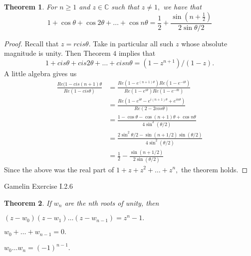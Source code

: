 \documentclass[letter]{article}
\newtheorem{theorem}{Theorem}
\newenvironment{menumerate}{%
  \edef\backupindent{\the\parindent}%
  \enumerate%
  \setlength{\parindent}{\backupindent}%
}{\endenumerate}
\begin{document}
\begin{menumerate}
        \begin{theorem}
            For $n\geq 1$ and $z \in \mathbb{C}$ such that $z \neq 1,$ we have that
            \begin{equation*}
                1 +\cos \theta + \cos 2 \theta + \dots + \cos n \theta = \frac12 + \frac{\sin(n + \frac12)}{2 \sin \theta/2}
            \end{equation*}
        \end{theorem}
        \begin{proof}
            Recall  that $z = r cis\theta.$ Take in particular all such $z$ whose absolute magnitude is unity. 
            Then Theorem $4$ implies that 
            \begin{equation*}
                1 + cis \theta + cis 2 \theta + \dots + cis n \theta = (1-z^{n+1})/(1-z).
            \end{equation*}
            A little algebra gives us 
            \begin{equation*}
                \begin{aligned}
                    \frac{Re(1 - cis (n+1)\theta}{Re(1 - cis \theta)} &= \frac{Re(1 - e^{(n+1)\theta})Re(1-e^{-i\theta})}{Re(1 - e^{i\theta})Re(1-e^{-\theta i})} \\
                    &= \frac{Re(1 - e^{i\theta} - e^{i(n+1)\theta} + e^{in\theta})}{Re(2 - 2cos\theta)} \\
                    &= \frac{1 - \cos\theta - \cos (n+1)\theta + \cos n \theta}{4 \sin^2(\theta/2)} \\
                    &= \frac{2\sin^2{\theta/2}- \sin(n  + 1/2)\sin(\theta/2)}{4 \sin^2(\theta/2)} \\
                    &= \frac12 -\frac{ \sin(n  + 1/2)}{2\sin(\theta/2)} 
                \end{aligned}
            \end{equation*}
            Since the above was the real part of $1 +z + z^2 + \dots + z^n,$ the theorem holds.
        \end{proof}
    \item Gamelin Exercise I.2.6
    \begin{theorem}
        If $w_n$ are the nth roots of unity, then
        \begin{menumerate}
            \item $(z-w_0)(z-w_1)\dots(z-w_{n-1})=z^n -1.$
            \item $w_0+ \dots + w_{n-1} = 0.$
            \item $w_0\dots w_n = (-1)^{n-1}.$

\end{menumerate}
\end{theorem}
\end{menumerate}
\end{document}
